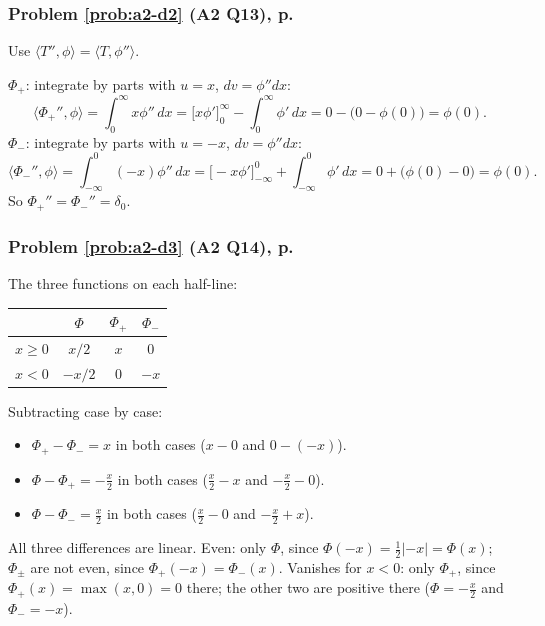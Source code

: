\documentclass{article}
\newcommand{\ip}[2]{\langle #1, #2 \rangle}
\begin{document}
\label{sol:a2-d2}
\subsubsection*{Problem \ref{prob:a2-d2} (A2 Q13), p.~\pageref{prob:a2-d2}}
Use $\ip{T''}{\phi} = \ip{T}{\phi''}$.\par
$\Phi_+$: integrate by parts with $u = x$, $dv = \phi''dx$:
\begin{equation*}
    \ip{\Phi_+''}{\phi} = \int_0^\infty x\phi''\,dx = \big[x\phi'\big]_0^\infty - \int_0^\infty\phi'\,dx = 0 - \big(0 - \phi(0)\big) = \phi(0).
\end{equation*}
$\Phi_-$: integrate by parts with $u = -x$, $dv = \phi''dx$:
\begin{equation*}
    \ip{\Phi_-''}{\phi} = \int_{-\infty}^0(-x)\phi''\,dx = \big[-x\phi'\big]_{-\infty}^0 + \int_{-\infty}^0\phi'\,dx = 0 + \big(\phi(0) - 0\big) = \phi(0).
\end{equation*}
So $\Phi_+'' = \Phi_-'' = \delta_0$.

\label{sol:a2-d3}
\subsubsection*{Problem \ref{prob:a2-d3} (A2 Q14), p.~\pageref{prob:a2-d3}}
The three functions on each half-line:
\begin{center}
\begin{tabular}{c|ccc}
    & $\Phi$ & $\Phi_+$ & $\Phi_-$ \\
    \hline
    $x \geq 0$ & $x/2$ & $x$ & $0$ \\
    $x < 0$ & $-x/2$ & $0$ & $-x$
\end{tabular}
\end{center}
Subtracting case by case:
\begin{itemize}
    \item $\Phi_+ - \Phi_- = x$ in both cases ($x - 0$ and $0 - (-x)$).
    \item $\Phi - \Phi_+ = -\frac x2$ in both cases ($\frac x2 - x$ and $-\frac x2 - 0$).
    \item $\Phi - \Phi_- = \frac x2$ in both cases ($\frac x2 - 0$ and $-\frac x2 + x$).
\end{itemize}
All three differences are linear. Even: only $\Phi$, since $\Phi(-x) = \frac12|-x| = \Phi(x)$; $\Phi_\pm$ are not even, since $\Phi_+(-x) = \Phi_-(x)$. Vanishes for $x < 0$: only $\Phi_+$, since $\Phi_+(x) = \max(x,0) = 0$ there; the other two are positive there ($\Phi = -\frac x2$ and $\Phi_- = -x$).
\end{document}
